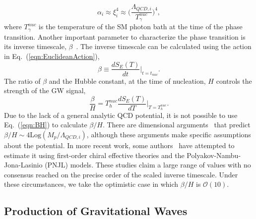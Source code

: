 \documentclass[nofootinbib,twocolumn,preprintnumbers]{revtex4-1}
\begin{document}
%
\begin{equation}\label{eqn:alpha2}
\alpha_i \approx \xi_i^{4} \approx \bigg( \frac{\Lambda_{QCD,i}}{T_{\gamma}^{nuc}}\bigg)^4,
\end{equation}
%
where $T_{\gamma}^{nuc}$ is the temperature of the SM photon bath at the time of the phase transition. Another important parameter to characterize the phase transition is its inverse timescale, $\beta$~\citep{Caprini:2015zlo}. The inverse timescale can be calculated using the action in Eq.~(\ref{eqn:EuclideanAction}), 
\begin{equation}
\beta  \equiv \frac{dS_{E}(T)}{dt}\bigg|_{t = t_{nuc}}.
\end{equation}
The ratio of $\beta$ and the Hubble constant, at the time of nucleation, $H$ controls the strength of the GW signal,
\begin{equation}\label{eqn:BH}
\frac{\beta}{H} = T^{nuc}_h \frac{dS_{E}(T)}{dT}\bigg|_{T = T^{nuc}_h}.
\end{equation}
Due to the lack of a general analytic QCD potential, it is not possible to use Eq.~(\ref{eqn:BH}) to calculate $\beta/H$. There are dimensional arguments~\cite{Hogan:1984hx,Hogan:1986qda} that predict $\beta/H \sim 4 \textrm{Log}(M_{p}/ \Lambda_{QCD,i})$, although these arguments make specific assumptions about the potential. In more recent work, some authors~\citep{Helmboldt:2019pan,Bai:2018dxf} have attempted to estimate it using first-order chiral effective theories and the Polyakov-Nambu-Jona-Lasinio (PNJL) models. These studies claim a large range of values with no consensus reached on the precise order of the scaled inverse timescale.  Under these circumstances, we take the optimistic case in which $\beta/H$ is $\mathcal{O}(10)$.



\subsection{Production of Gravitational Waves}
\label{sec:signals}
\end{document}
